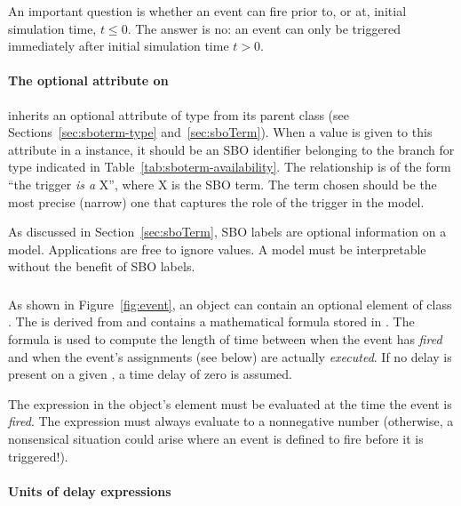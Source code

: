 An important question is whether an event can fire prior to, or
at, initial simulation time, \ie $t \leq 0$.  The answer is no: an
event can only be triggered immediately after initial simulation
time \ie $t > 0$.


\paragraph{The optional  attribute on }
\label{sec:trigger-sboterm}

\Trigger  inherits an optional 
attribute of type  from its parent
class \SBase (see Sections~\ref{sec:sboterm-type}
and~\ref{sec:sboTerm}).  When a value is given to this
attribute in a  \Trigger instance, it should be an
SBO identifier belonging to the branch for type  \Trigger
indicated in Table~\ref{tab:sboterm-availability}.  The relationship is
of the form ``the trigger \emph{is a} X'', where X is
the SBO term.  The term chosen should be the most precise (narrow)
one that captures the role of the trigger  in the model.

As discussed in Section~\ref{sec:sboTerm}, SBO labels are optional
information on a model.  Applications are free to ignore
 values.  A model must be interpretable without the
benefit of SBO labels.

\subsubsection{}
\label{sec:event-delay}

As shown in Figure~\ref{fig:event}, an \Event object can contain
an optional  element of class \Delay.  The \Delay is
derived from \SBase and contains a mathematical formula stored in
.  The formula is used to compute the length of time
between when the event has \emph{fired} and when the event's
assignments (see below) are actually \emph{executed}.  If no delay
is present on a given \Event, a time delay of zero is assumed.

The expression in the \Delay object's  element must be evaluated at the time the
event is \emph{fired}.  The expression must always evaluate to a
nonnegative number (otherwise, a nonsensical situation could arise
where an event is defined to fire before it is triggered!).  


\paragraph{Units of delay expressions}


